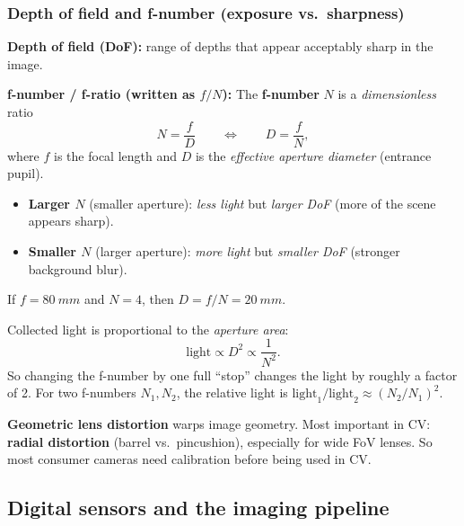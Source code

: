 \documentclass[11pt,a4paper]{article}
\begin{document}
\subsubsection{Depth of field and f-number (exposure vs.\ sharpness)}

\begin{defbox}
\textbf{Depth of field (DoF):} range of depths that appear acceptably sharp in the image.
\end{defbox}

\begin{mathrule}
\textbf{f-number / f-ratio (written as $f/N$):}\;
The \textbf{f-number} $N$ is a \emph{dimensionless} ratio
\[
N=\frac{f}{D}
\qquad\Longleftrightarrow\qquad
D=\frac{f}{N},
\]
where $f$ is the focal length and $D$ is the \emph{effective aperture diameter} (entrance pupil).
\end{mathrule}

\begin{itemize}
  \item \textbf{Larger $N$} (smaller aperture): \emph{less light} but \emph{larger DoF} (more of the scene appears sharp).
  \item \textbf{Smaller $N$} (larger aperture): \emph{more light} but \emph{smaller DoF} (stronger background blur).
\end{itemize}

\begin{exbox}
If $f=\SI{80}{mm}$ and $N=4$, then $D=f/N=\SI{20}{mm}$.
\end{exbox}

\begin{notebox}
Collected light is proportional to the \emph{aperture area}:
\[
\text{light} \propto D^2 \propto \frac{1}{N^2}.
\]
So changing the f-number by one full ``stop'' changes the light by roughly a factor of 2.
For two f-numbers $N_1,N_2$, the relative light is $\text{light}_1/\text{light}_2 \approx (N_2/N_1)^2$.
\end{notebox}

\begin{defbox}
\textbf{Geometric lens distortion} warps image geometry. Most important in CV: \textbf{radial distortion}
(barrel vs.\ pincushion), especially for wide FoV lenses. So most consumer cameras need calibration before being used in CV.
\end{defbox}

\subsection{Digital sensors and the imaging pipeline}
\end{document}

